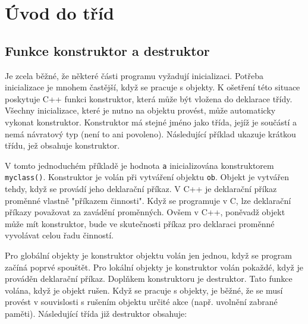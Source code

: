   \section{Úvod do tříd}
  
    \subsection{Funkce konstruktor a destruktor}
      Je zcela běžné, že některé části programu vyžadují inicializaci. Potřeba inicializace je 
      mnohem častější, když se pracuje s objekty. K ošetření této situace poskytuje C++ funkci 
      konstruktor, která může být vložena do deklarace třídy. Všechny inicializace, které je nutno 
      na objektu provést, může automaticky vykonat konstruktor. Konstruktor má stejné jméno jako 
      třída, jejíž je součástí a nemá návratový typ (není to ani povoleno). Následující příklad 
      ukazuje krátkou třídu, jež obsahuje konstruktor.
  
      
  
      V tomto jednoduchém příkladě je hodnota \lstinline[basicstyle=\ttfamily]!a! inicializována 
      konstruktorem \lstinline[basicstyle=\ttfamily]!myclass()!. Konstruktor je volán při vytváření 
      objektu \lstinline[basicstyle=\ttfamily]!ob!. Objekt je vytvářen tehdy, když se provádí jeho 
      deklarační příkaz. V C++ je deklarační příkaz proměnné vlastně "příkazem činnosti". Když se 
      programuje v C, lze deklarační příkazy považovat za zavádění proměnných. Ovšem v C++, 
      poněvadž objekt může mít konstruktor, bude ve skutečnosti příkaz pro deklaraci proměnné 
      vyvolávat celou řadu činností.
  
      Pro globální objekty je konstruktor objektu volán jen jednou, když se program začíná poprvé 
      spouštět. Pro lokální objekty je konstruktor volán pokaždé, když je prováděn deklarační 
      příkaz. Doplňkem konstruktoru je destruktor. Tato funkce volána, když je objekt rušen. Když 
      se pracuje s objekty, je běžné, že se musí provést v souvislosti s rušením objektu určité 
      akce (např. uvolnění zabrané paměti). Následující třída již destruktor obsahuje:
      
  

